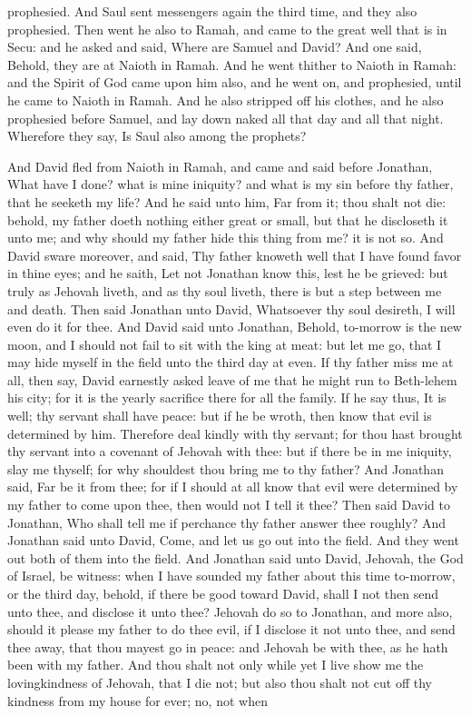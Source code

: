 prophesied. And Saul sent messengers again the third time, and they also prophesied. Then went he also to Ramah, and came to the great well that is in Secu: and he asked and said, Where are Samuel and David? And one said, Behold, they are at Naioth in Ramah. And he went thither to Naioth in Ramah: and the Spirit of God came upon him also, and he went on, and prophesied, until he came to Naioth in Ramah. And he also stripped off his clothes, and he also prophesied before Samuel, and lay down naked all that day and all that night. Wherefore they say, Is Saul also among the prophets? 

And David fled from Naioth in Ramah, and came and said before Jonathan, What have I done? what is mine iniquity? and what is my sin before thy father, that he seeketh my life? And he said unto him, Far from it; thou shalt not die: behold, my father doeth nothing either great or small, but that he discloseth it unto me; and why should my father hide this thing from me? it is not so. And David sware moreover, and said, Thy father knoweth well that I have found favor in thine eyes; and he saith, Let not Jonathan know this, lest he be grieved: but truly as Jehovah liveth, and as thy soul liveth, there is but a step between me and death. Then said Jonathan unto David, Whatsoever thy soul desireth, I will even do it for thee. And David said unto Jonathan, Behold, to-morrow is the new moon, and I should not fail to sit with the king at meat: but let me go, that I may hide myself in the field unto the third day at even. If thy father miss me at all, then say, David earnestly asked leave of me that he might run to Beth-lehem his city; for it is the yearly sacrifice there for all the family. If he say thus, It is well; thy servant shall have peace: but if he be wroth, then know that evil is determined by him. Therefore deal kindly with thy servant; for thou hast brought thy servant into a covenant of Jehovah with thee: but if there be in me iniquity, slay me thyself; for why shouldest thou bring me to thy father? And Jonathan said, Far be it from thee; for if I should at all know that evil were determined by my father to come upon thee, then would not I tell it thee? Then said David to Jonathan, Who shall tell me if perchance thy father answer thee roughly? And Jonathan said unto David, Come, and let us go out into the field. And they went out both of them into the field.  And Jonathan said unto David, Jehovah, the God of Israel, be witness: when I have sounded my father about this time to-morrow, or the third day, behold, if there be good toward David, shall I not then send unto thee, and disclose it unto thee? Jehovah do so to Jonathan, and more also, should it please my father to do thee evil, if I disclose it not unto thee, and send thee away, that thou mayest go in peace: and Jehovah be with thee, as he hath been with my father. And thou shalt not only while yet I live show me the lovingkindness of Jehovah, that I die not; but also thou shalt not cut off thy kindness from my house for ever; no, not when 